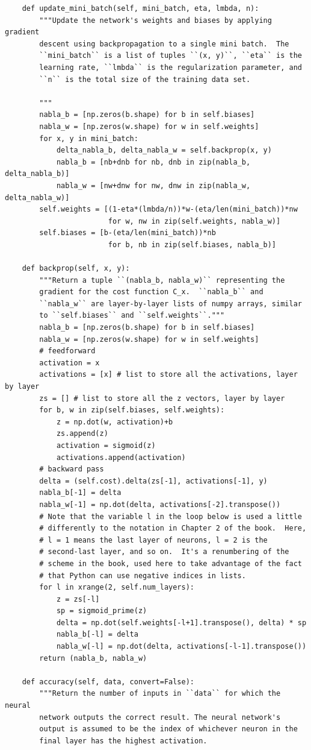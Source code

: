 \documentclass[a4paper,twoside,10pt]{book}
\begin{document}
\begin{lstlisting}
	def update_mini_batch(self, mini_batch, eta, lmbda, n):
		"""Update the network's weights and biases by applying gradient
		descent using backpropagation to a single mini batch.  The
		``mini_batch`` is a list of tuples ``(x, y)``, ``eta`` is the
		learning rate, ``lmbda`` is the regularization parameter, and
		``n`` is the total size of the training data set.
		
		"""
		nabla_b = [np.zeros(b.shape) for b in self.biases]
		nabla_w = [np.zeros(w.shape) for w in self.weights]
		for x, y in mini_batch:
			delta_nabla_b, delta_nabla_w = self.backprop(x, y)
			nabla_b = [nb+dnb for nb, dnb in zip(nabla_b, delta_nabla_b)]
			nabla_w = [nw+dnw for nw, dnw in zip(nabla_w, delta_nabla_w)]
		self.weights = [(1-eta*(lmbda/n))*w-(eta/len(mini_batch))*nw
						for w, nw in zip(self.weights, nabla_w)]
		self.biases = [b-(eta/len(mini_batch))*nb
						for b, nb in zip(self.biases, nabla_b)]

	def backprop(self, x, y):
		"""Return a tuple ``(nabla_b, nabla_w)`` representing the
		gradient for the cost function C_x.  ``nabla_b`` and
		``nabla_w`` are layer-by-layer lists of numpy arrays, similar
		to ``self.biases`` and ``self.weights``."""
		nabla_b = [np.zeros(b.shape) for b in self.biases]
		nabla_w = [np.zeros(w.shape) for w in self.weights]
		# feedforward
		activation = x
		activations = [x] # list to store all the activations, layer by layer
		zs = [] # list to store all the z vectors, layer by layer
		for b, w in zip(self.biases, self.weights):
			z = np.dot(w, activation)+b
			zs.append(z)
			activation = sigmoid(z)
			activations.append(activation)
		# backward pass
		delta = (self.cost).delta(zs[-1], activations[-1], y)
		nabla_b[-1] = delta
		nabla_w[-1] = np.dot(delta, activations[-2].transpose())
		# Note that the variable l in the loop below is used a little
		# differently to the notation in Chapter 2 of the book.  Here,
		# l = 1 means the last layer of neurons, l = 2 is the
		# second-last layer, and so on.  It's a renumbering of the
		# scheme in the book, used here to take advantage of the fact
		# that Python can use negative indices in lists.
		for l in xrange(2, self.num_layers):
			z = zs[-l]
			sp = sigmoid_prime(z)
			delta = np.dot(self.weights[-l+1].transpose(), delta) * sp
			nabla_b[-l] = delta
			nabla_w[-l] = np.dot(delta, activations[-l-1].transpose())
		return (nabla_b, nabla_w)
	
	def accuracy(self, data, convert=False):
		"""Return the number of inputs in ``data`` for which the neural
		network outputs the correct result. The neural network's
		output is assumed to be the index of whichever neuron in the
		final layer has the highest activation.
		

\end{lstlisting}
\end{document}
